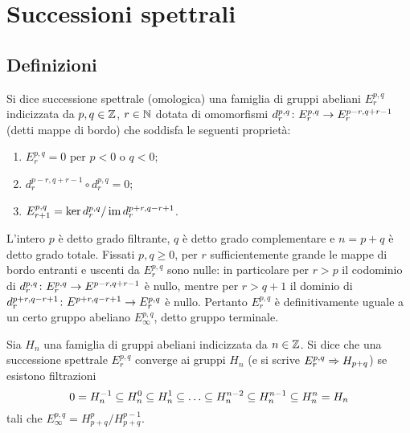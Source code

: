 \chapter{Successioni spettrali}
\label{ch:spectral-sequences}
\section{Definizioni}
\begin{definition}
Si dice successione spettrale (omologica) una famiglia di gruppi abeliani $E^{p,q}_r$ indicizzata da $p,q\in\mathbb{Z}$, $r\in\mathbb{N}$ dotata di omomorfismi $d^{p,q}_r\colon E^{p,q}_r\to E^{p-r,q+r-1}_r$ (detti mappe di bordo) che soddisfa le seguenti proprietà:
\begin{enumerate}
\item $E^{p,q}_r=0$ per $p<0$ o $q<0$;
\item $d^{p-r,q+r-1}_r\circ d^{p,q}_r=0$;
\item $E^{p,q}_{r+1}=\ker d^{p,q}_r/\operatorname{im} d^{p+r,q-r+1}_r$.
\end{enumerate}
\end{definition}
L'intero $p$ è detto grado filtrante, $q$ è detto grado complementare e $n=p+q$ è detto grado totale. Fissati $p,q\ge 0$, per $r$ sufficientemente grande le mappe di bordo entranti e uscenti da $E^{p,q}_r$ sono nulle: in particolare per $r>p$ il codominio di $d^{p,q}_r\colon E^{p,q}_r\to E^{p-r,q+r-1}$ è nullo, mentre per $r>q+1$ il dominio di $d^{p+r,q-r+1}_r\colon E^{p+r,q-r+1}\to E^{p,q}_r$ è nullo. Pertanto $E^{p,q}_r$ è definitivamente uguale a un certo gruppo abeliano $E^{p,q}_\infty$, detto gruppo terminale.
\begin{definition}
Sia $H_n$ una famiglia di gruppi abeliani indicizzata da $n\in\mathbb{Z}$. Si dice che una successione spettrale $E^{p,q}_r$ converge ai gruppi $H_n$ (e si scrive $E^{p,q}_r\Rightarrow H_{p+q}$) se esistono filtrazioni
$$
0=H^{-1}_n\subseteq H^0_n\subseteq H^1_n\subseteq\ldots\subseteq H^{n-2}_n\subseteq H^{n-1}_n\subseteq H^n_n=H_n
$$
tali che $E^{p,q}_\infty=H^p_{p+q}/H^{p-1}_{p+q}$.
\end{definition}

